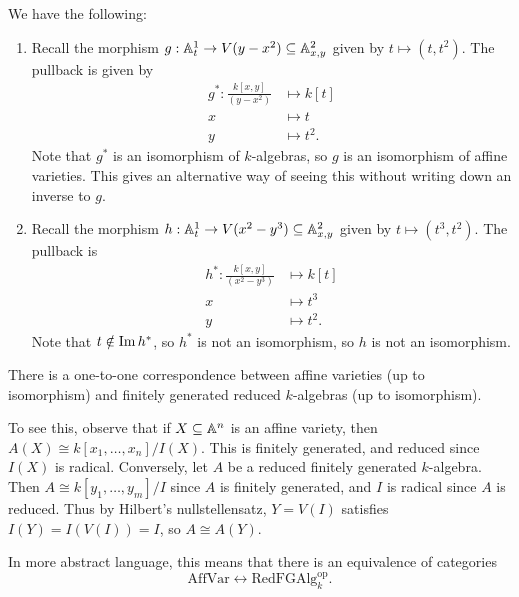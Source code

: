 \begin{example}
  We have the following:
  \begin{enumerate}
    \item Recall the morphism
      $g : \mathbb{A}^1_t \to V(y - x^2) \subseteq \mathbb{A}_{x, y}^2$
      given by $t \mapsto (t, t^2)$.
      The pullback is given by
      \begin{align*}
        g^* : \frac{k[x, y]}{(y - x^2)}
        &\longmapsto k[t] \\
        x &\longmapsto t \\
        y &\longmapsto t^2.
      \end{align*}
      Note that $g^*$ is an isomorphism
      of $k$-algebras, so
      $g$ is an isomorphism of affine varieties.
      This gives an alternative way of
      seeing this without writing down
      an inverse to $g$.
    \item Recall the morphism
      $h : \mathbb{A}^1_t \to V(x^2 - y^3) \subseteq \mathbb{A}_{x, y}^2$
      given by $t \mapsto (t^3, t^2)$.
      The pullback is
      \begin{align*}
        h^* : \frac{k[x, y]}{(x^2 - y^3)}
        &\longmapsto k[t] \\
        x &\longmapsto t^3 \\
        y &\longmapsto t^2.
      \end{align*}
      Note that $t \notin \operatorname{Im} h^*$,
      so $h^*$ is not an isomorphism,
      so $h$ is not an isomorphism.
  \end{enumerate}
\end{example}

\begin{remark}
  There is a one-to-one correspondence
  between affine varieties (up to isomorphism)
  and finitely generated reduced
  $k$-algebras (up to isomorphism).

  To see this, observe that if $X \subseteq \mathbb{A}^n$
  is an affine variety, then
  $A(X) \cong k[x_1, \dots, x_n]/I(X)$. This
  is finitely generated, and reduced since
  $I(X)$ is radical. Conversely, let
  $A$ be a reduced finitely generated
  $k$-algebra. Then
  $A \cong k[y_1, \dots, y_m] / I$ since
  $A$ is finitely generated, and
  $I$ is radical since $A$ is reduced.
  Thus by Hilbert's nullstellensatz,
  $Y = V(I)$ satisfies
  $I(Y) = I(V(I)) = I$, so
  $A \cong A(Y)$.

  In more abstract language, this means
  that there is an equivalence of
  categories
  \[
    \mathrm{AffVar}
    \longleftrightarrow
    \mathrm{RedFGAlg}_k^\mathrm{op}.
  \]
\end{remark}

